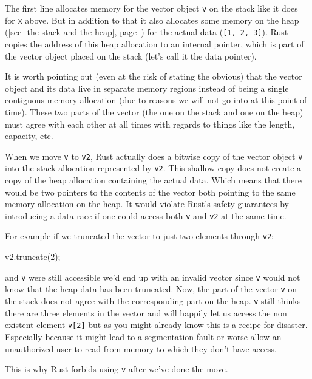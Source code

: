 \documentclass[a4paper,]{book}
\renewcommand*{\hyperlink}[2]{%
 #2 (\autoref{#1}, page~\pageref{#1})}
\newenvironment{Shaded}{\begin{snugshade}}{\end{snugshade}}
\newcommand{\DecValTok}[1]{\textcolor[rgb]{0.00,0.00,0.81}{{#1}}}
\newcommand{\NormalTok}[1]{{#1}}
\begin{document}
The first line allocates memory for the vector object \texttt{v} on the
stack like it does for \texttt{x} above. But in addition to that it also
allocates some memory on the
\protect\hyperlink{sec--the-stack-and-the-heap}{heap} for the actual
data (\texttt{{[}1,\ 2,\ 3{]}}). Rust copies the address of this heap
allocation to an internal pointer, which is part of the vector object
placed on the stack (let's call it the data pointer).

It is worth pointing out (even at the risk of stating the obvious) that
the vector object and its data live in separate memory regions instead
of being a single contiguous memory allocation (due to reasons we will
not go into at this point of time). These two parts of the vector (the
one on the stack and one on the heap) must agree with each other at all
times with regards to things like the length, capacity, etc.

When we move \texttt{v} to \texttt{v2}, Rust actually does a bitwise
copy of the vector object \texttt{v} into the stack allocation
represented by \texttt{v2}. This shallow copy does not create a copy of
the heap allocation containing the actual data. Which means that there
would be two pointers to the contents of the vector both pointing to the
same memory allocation on the heap. It would violate Rust's safety
guarantees by introducing a data race if one could access both
\texttt{v} and \texttt{v2} at the same time.

For example if we truncated the vector to just two elements through
\texttt{v2}:

\begin{Shaded}
\begin{Highlighting}[]
\NormalTok{v2.truncate(}\DecValTok{2}\NormalTok{);}
\end{Highlighting}
\end{Shaded}

and \texttt{v} were still accessible we'd end up with an invalid vector
since \texttt{v} would not know that the heap data has been truncated.
Now, the part of the vector \texttt{v} on the stack does not agree with
the corresponding part on the heap. \texttt{v} still thinks there are
three elements in the vector and will happily let us access the non
existent element \texttt{v{[}2{]}} but as you might already know this is
a recipe for disaster. Especially because it might lead to a
segmentation fault or worse allow an unauthorized user to read from
memory to which they don't have access.

This is why Rust forbids using \texttt{v} after we've done the move.
\end{document}
